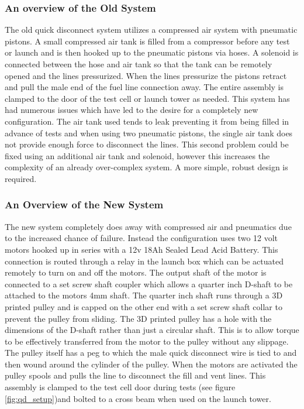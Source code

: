 \documentclass[10pt,a4paper]{article}
\begin{document}
\subsubsection{An overview of the Old System}
	The old quick disconnect system utilizes a compressed air system with pneumatic pistons. A small compressed air tank is filled from a compressor before any test or launch and is then hooked up to the pneumatic pistons via hoses. A solenoid is connected between the hose and air tank so that the tank can be remotely opened and the lines pressurized. When the lines pressurize the pistons retract and pull the male end of the fuel line connection away. The entire assembly is clamped to the door of the test cell or launch tower as needed. This system has had numerous issues which have led to the desire for a completely new configuration. The air tank used tends to leak preventing it from being filled in advance of tests and when using two pneumatic pistons, the single air tank does not provide enough force to disconnect the lines. This second problem could be fixed using an additional air tank and solenoid, however this increases the complexity of an already over-complex system. A more simple, robust design is required.

\subsubsection{An Overview of the New System}
	The new system completely does away with compressed air and pneumatics due to the increased chance of failure. Instead the configuration uses two 12 volt motors hooked up in series with a 12v 18Ah Sealed Lead Acid Battery. This connection is routed through a relay in the launch box which can be actuated remotely to turn on and off the motors. The output shaft of the motor is connected to a set screw shaft coupler which allows a quarter inch D-shaft to be attached to the motors 4mm shaft. The quarter inch shaft runs through a 3D printed pulley and is capped on the other end with a set screw shaft collar to prevent the pulley from sliding. The 3D printed pulley has a hole with the dimensions of the D-shaft rather than just a circular shaft. This is to allow torque to be effectively transferred from the motor to the pulley without any slippage. The pulley itself has a peg to which the male quick disconnect wire is tied to and then wound around the cylinder of the pulley. When the motors are activated the pulley spools and pulls the line to disconnect the fill and vent lines. This assembly is clamped to the test cell door during tests (see figure \ref{fig:qd_setup})and bolted to a cross beam when used on the launch tower.
\end{document}
